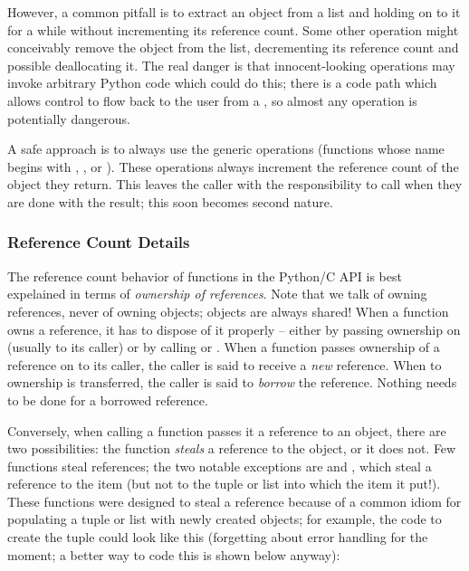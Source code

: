However, a common pitfall is to extract an object from a list and 
holding on to it for a while without incrementing its reference count.  
Some other operation might conceivably remove the object from the 
list, decrementing its reference count and possible deallocating it.  
The real danger is that innocent-looking operations may invoke 
arbitrary Python code which could do this; there is a code path which 
allows control to flow back to the user from a , so 
almost any operation is potentially dangerous.

A safe approach is to always use the generic operations (functions 
whose name begins with , , 
 or ).  These operations always 
increment the reference count of the object they return.  This leaves 
the caller with the responsibility to call  when 
they are done with the result; this soon becomes second nature.

\subsubsection{Reference Count Details}

The reference count behavior of functions in the Python/C API is best 
expelained in terms of \emph{ownership of references}.  Note that we 
talk of owning references, never of owning objects; objects are always 
shared!  When a function owns a reference, it has to dispose of it 
properly -- either by passing ownership on (usually to its caller) or 
by calling  or .  When a function 
passes ownership of a reference on to its caller, the caller is said 
to receive a \emph{new} reference.  When to ownership is transferred, 
the caller is said to \emph{borrow} the reference.  Nothing needs to 
be done for a borrowed reference.

Conversely, when calling a function passes it a reference to an 
object, there are two possibilities: the function \emph{steals} a 
reference to the object, or it does not.  Few functions steal 
references; the two notable exceptions are  and 
, which steal a reference to the item (but not to 
the tuple or list into which the item it put!).  These functions were
designed to steal a reference because of a common idiom for populating
a tuple or list with newly created objects; for example, the code to
create the tuple  could look like this
(forgetting about error handling for the moment; a better way to code
this is shown below anyway):

